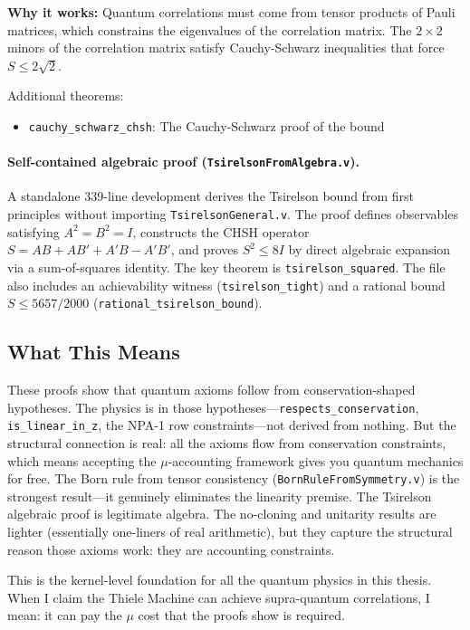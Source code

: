 \textbf{Why it works:} Quantum correlations must come from tensor products of Pauli matrices, which constrains the eigenvalues of the correlation matrix. The $2 \times 2$ minors of the correlation matrix satisfy Cauchy-Schwarz inequalities that force $S \leq 2\sqrt{2}$.

Additional theorems:
\begin{itemize}
    \item \texttt{cauchy\_schwarz\_chsh}: The Cauchy-Schwarz proof of the bound
\end{itemize}

\paragraph{Self-contained algebraic proof (\texttt{TsirelsonFromAlgebra.v}).}
A standalone 339-line development derives the Tsirelson bound from first principles without importing \texttt{TsirelsonGeneral.v}. The proof defines observables satisfying $A^2 = B^2 = I$, constructs the CHSH operator $S = AB + AB' + A'B - A'B'$, and proves $S^2 \leq 8I$ by direct algebraic expansion via a sum-of-squares identity. The key theorem is \texttt{tsirelson\_squared}. The file also includes an achievability witness (\texttt{tsirelson\_tight}) and a rational bound $S \leq 5657/2000$ (\texttt{rational\_tsirelson\_bound}).

\subsection{What This Means}

These proofs show that quantum axioms follow from conservation-shaped hypotheses. The physics is in those hypotheses---\texttt{respects\_conservation}, \texttt{is\_linear\_in\_z}, the NPA-1 row constraints---not derived from nothing. But the structural connection is real: all the axioms flow from conservation constraints, which means accepting the $\mu$-accounting framework gives you quantum mechanics for free. The Born rule from tensor consistency (\texttt{BornRuleFromSymmetry.v}) is the strongest result---it genuinely eliminates the linearity premise. The Tsirelson algebraic proof is legitimate algebra. The no-cloning and unitarity results are lighter (essentially one-liners of real arithmetic), but they capture the structural reason those axioms work: they are accounting constraints.

This is the kernel-level foundation for all the quantum physics in this thesis. When I claim the Thiele Machine can achieve supra-quantum correlations, I mean: it can pay the $\mu$ cost that the proofs show is required.

